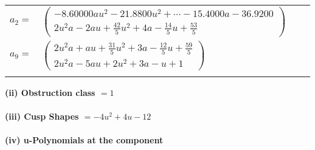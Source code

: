 \documentclass[1p]{elsarticle_modified}
\theoremstyle{definition}
\begin{document}
\begin{tabular}{m{7pt} m{180pt} m{7pt} m{180pt} }
\flushright $a_{2}=$&$\begin{pmatrix}-8.60000 a u^{2}-21.8800 u^{2}+\cdots-15.4000 a-36.9200\\2 u^2 a-2 a u+\frac{42}{5} u^2+4 a-\frac{14}{5} u+\frac{53}{5}\end{pmatrix}$ \\
\flushright $a_{9}=$&$\begin{pmatrix}2 u^2 a+a u+\frac{31}{5} u^2+3 a-\frac{12}{5} u+\frac{59}{5}\\2 u^2 a-5 a u+2 u^2+3 a- u+1\end{pmatrix}$\\&\end{tabular}
\flushleft \textbf{(ii) Obstruction class $= 1$}\\~\\
\flushleft \textbf{(iii) Cusp Shapes $= -4 u^2+4 u-12$}\\~\\
\newpage\renewcommand{\arraystretch}{1}
\flushleft \textbf{(iv) u-Polynomials at the component}\newline \\
\end{document}
